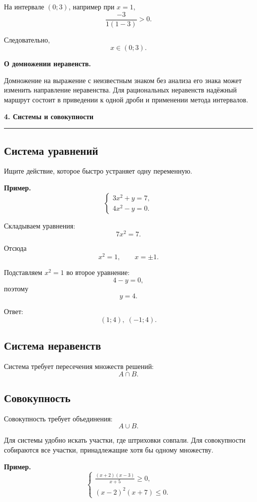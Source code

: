 \documentclass[a4paper,12pt]{article}
\newcommand{\topic}[1]{%
  \vspace{0.8em}%
  {\Large\bfseries\color{darkaccent}#1}\par
  \vspace{0.25em}%
  {\color{accent}\rule{\linewidth}{0.6pt}}\par
  \vspace{0.45em}%
}
\newcommand{\key}[1]{%
  \textbf{\color{darkaccent}#1}%
}
\begin{document}
На интервале \((0;3)\), например при \(x=1\),
\[
\frac{-3}{1(1-3)}>0.
\]

Следовательно,
\[
\boxed{x\in(0;3)}.
\]

\key{О домножении неравенств.}
Домножение на выражение с неизвестным знаком без анализа его знака
может изменить направление неравенства. Для рациональных
неравенств надёжный маршрут состоит в приведении к одной дроби и
применении метода интервалов.


\topic{4. Системы и совокупности}

\subsection*{Система уравнений}

Ищите действие, которое быстро устраняет одну переменную.

\textbf{Пример.}
\[
\begin{cases}
3x^2+y=7,\\
4x^2-y=0.
\end{cases}
\]

Складываем уравнения:
\[
7x^2=7.
\]

Отсюда
\[
x^2=1,
\qquad
x=\pm1.
\]

Подставляем \(x^2=1\) во второе уравнение:
\[
4-y=0,
\]
поэтому
\[
y=4.
\]

Ответ:
\[
\boxed{(1;4),\;(-1;4)}.
\]

\subsection*{Система неравенств}

Система требует пересечения множеств решений:
\[
A\cap B.
\]

\subsection*{Совокупность}

Совокупность требует объединения:
\[
A\cup B.
\]

Для системы удобно искать участки, где штриховки совпали.
Для совокупности собираются все участки, принадлежащие хотя бы одному
множеству.

\textbf{Пример.}
\[
\begin{cases}
\displaystyle
\frac{(x+2)(x-3)}{x+5}\ge0,
\\[0.6em]
(x-2)^2(x+7)\le0.
\end{cases}
\]
\end{document}
